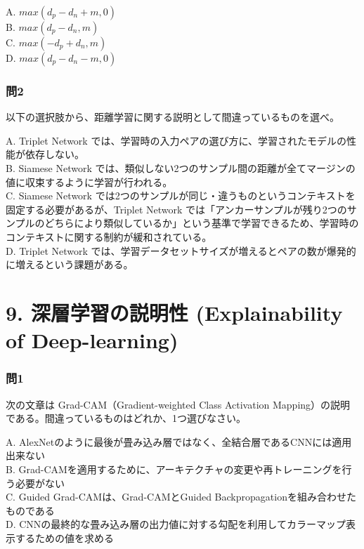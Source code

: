 \documentclass[
  letterpaper,
  DIV=11,
  numbers=noendperiod]{scrreprt}
\begin{document}
A. \({max(d_p - d_n + m, 0)}\)\\
B. \({max(d_p - d_n, m)}\)\\
C. \({max(-d_p + d_n, m)}\)\\
D. \({max(d_p - d_n - m, 0)}\)

\subsection{問2}\label{ux554f2-5}

以下の選択肢から、距離学習に関する説明として間違っているものを選べ。

A. Triplet Network
では、学習時の入力ペアの選び方に、学習されたモデルの性能が依存しない。\\
B. Siamese Network
では、類似しない2つのサンプル間の距離が全てマージンの値に収束するように学習が行われる。\\
C. Siamese Network
では2つのサンプルが同じ・違うものというコンテキストを固定する必要があるが、Triplet
Network
では「アンカーサンプルが残り2つのサンプルのどちらにより類似しているか」という基準で学習できるため、学習時のコンテキストに関する制約が緩和されている。\\
D. Triplet Network
では、学習データセットサイズが増えるとペアの数が爆発的に増えるという課題がある。

\chapter{9. 深層学習の説明性 (Explainability of
Deep-learning)}\label{ux6df1ux5c64ux5b66ux7fd2ux306eux8aacux660eux6027-explainability-of-deep-learning}

\subsection{問1}\label{ux554f1-10}

次の文章は Grad-CAM（Gradient-weighted Class Activation
Mapping）の説明である。間違っているものはどれか、1つ選びなさい。

A.
AlexNetのように最後が畳み込み層ではなく、全結合層であるCNNには適用出来ない\\
B.
Grad-CAMを適用するために、アーキテクチャの変更や再トレーニングを行う必要がない\\
C. Guided Grad-CAMは、Grad-CAMとGuided
Backpropagationを組み合わせたものである\\
D.
CNNの最終的な畳み込み層の出力値に対する勾配を利用してカラーマップ表示するための値を求める
\end{document}
